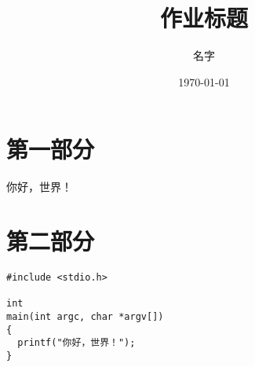 \documentclass{bjtuhw}
\title{作业标题}
\author{名字}
\date{\today}
\begin{document}
\maketitle
\newpage

\section{第一部分}
你好，世界！

\section{第二部分}
\begin{verbatim}
#include <stdio.h>

int
main(int argc, char *argv[])
{
  printf("你好，世界！");
}
\end{verbatim}
\end{document}
